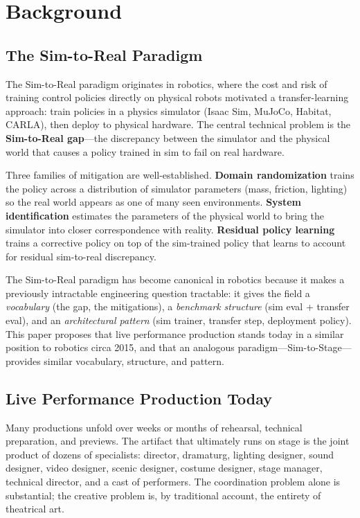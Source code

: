 \documentclass[11pt]{article}
\begin{document}
\section{Background}

\subsection{The Sim-to-Real Paradigm}

The Sim-to-Real paradigm originates in robotics, where the cost and risk of
training control policies directly on physical robots motivated a
transfer-learning approach: train policies in a physics simulator (Isaac
Sim, MuJoCo, Habitat, CARLA), then deploy to physical hardware.  The
central technical problem is the \textbf{Sim-to-Real gap}---the discrepancy
between the simulator and the physical world that causes a policy trained in
sim to fail on real hardware.

Three families of mitigation are well-established.  \textbf{Domain
randomization} trains the policy across a distribution of simulator
parameters (mass, friction, lighting) so the real world appears as one of
many seen environments.  \textbf{System identification} estimates the
parameters of the physical world to bring the simulator into closer
correspondence with reality.  \textbf{Residual policy learning} trains a
corrective policy on top of the sim-trained policy that learns to account
for residual sim-to-real discrepancy.

The Sim-to-Real paradigm has become canonical in robotics because it makes
a previously intractable engineering question tractable: it gives the field
a \emph{vocabulary} (the gap, the mitigations), a \emph{benchmark
structure} (sim eval + transfer eval), and an \emph{architectural pattern}
(sim trainer, transfer step, deployment policy).  This paper proposes that
live performance production stands today in a similar position to robotics
circa 2015, and that an analogous paradigm---Sim-to-Stage---provides
similar vocabulary, structure, and pattern.

\subsection{Live Performance Production Today}

Many productions unfold over weeks or months of rehearsal, technical
preparation, and previews.  The artifact that ultimately runs on stage is
the joint product of dozens of specialists: director, dramaturg, lighting
designer, sound designer, video designer, scenic designer, costume
designer, stage manager, technical director, and a cast of performers.
The coordination problem alone is substantial; the creative problem is, by
traditional account, the entirety of theatrical art.
\end{document}
